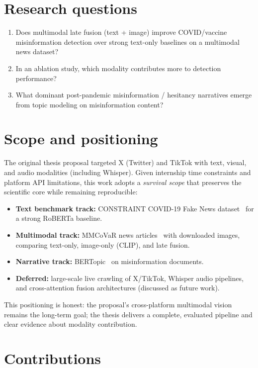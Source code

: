 \section{Research questions}

\begin{enumerate}[label=\textbf{RQ\arabic*.}]
  \item Does multimodal late fusion (text + image) improve COVID/vaccine misinformation detection over strong text-only baselines on a multimodal news dataset?
  \item In an ablation study, which modality contributes more to detection performance?
  \item What dominant post-pandemic misinformation / hesitancy narratives emerge from topic modeling on misinformation content?
\end{enumerate}

\section{Scope and positioning}

The original thesis proposal targeted X (Twitter) and TikTok with text, visual, and audio modalities (including Whisper).
Given internship time constraints and platform API limitations, this work adopts a \emph{survival scope} that preserves the scientific core while remaining reproducible:

\begin{itemize}
  \item \textbf{Text benchmark track:} CONSTRAINT COVID-19 Fake News dataset~\cite{patwa2021fighting} for a strong RoBERTa baseline.
  \item \textbf{Multimodal track:} MMCoVaR news articles~\cite{chen2021mmcovar} with downloaded images, comparing text-only, image-only (CLIP), and late fusion.
  \item \textbf{Narrative track:} BERTopic~\cite{grootendorst2022bertopic} on misinformation documents.
  \item \textbf{Deferred:} large-scale live crawling of X/TikTok, Whisper audio pipelines, and cross-attention fusion architectures (discussed as future work).
\end{itemize}

This positioning is honest: the proposal's cross-platform multimodal vision remains the long-term goal; the thesis delivers a complete, evaluated pipeline and clear evidence about modality contribution.

\section{Contributions}

